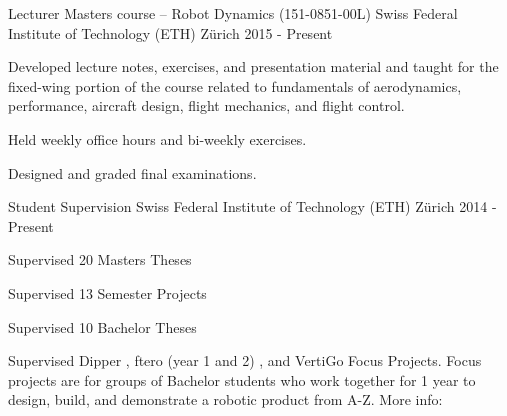 \label{sec:teaching}
\begin{cventries}


\cvprojwideentry
  	{Lecturer} %
  	{Masters course -- Robot Dynamics (151-0851-00L)} %
    {Swiss Federal Institute of Technology (ETH) Z\"{u}rich} %
    {2015 - Present} %
    {
      \begin{cvitems} %
        \item Developed lecture notes, exercises, and presentation material and taught for the fixed-wing portion of the course related to fundamentals of aerodynamics, performance, aircraft design, flight mechanics, and flight control.
		\item Held weekly office hours and bi-weekly exercises.
		\item Designed and graded final examinations.
      \end{cvitems}
    } %
    {} %
    {\showprojectdescriptions}
\vspace*{-9pt}
\cvprojwideentry
  	{Student Supervision} %
  	{} %
    {Swiss Federal Institute of Technology (ETH) Z\"{u}rich} %
    {2014 - Present} %
    {
      \begin{cvitems} %
        \item Supervised 20 Masters Theses
		\item Supervised 13 Semester Projects
		\item Supervised 10 Bachelor Theses
		\item Supervised Dipper , ftero (year 1 and 2) , and VertiGo  Focus Projects. Focus projects are for groups of Bachelor students who work together for 1 year to design, build, and demonstrate a robotic product from A-Z. More info: 

\end{cvitems}}
\end{cventries}
